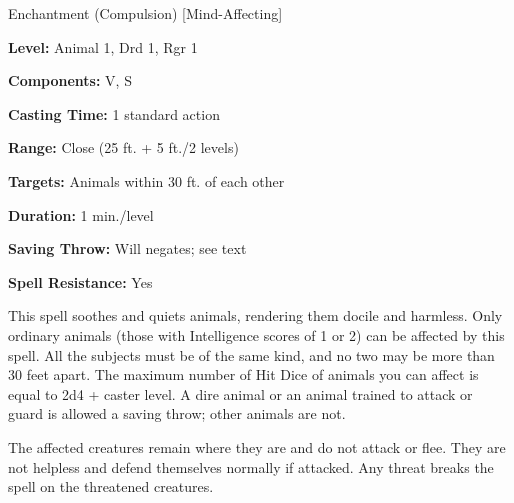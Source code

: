
Enchantment (Compulsion) [Mind-Affecting]

\textbf{Level:} Animal 1, Drd 1, Rgr 1

\textbf{Components:} V, S

\textbf{Casting Time:} 1 standard action

\textbf{Range:} Close (25 ft. + 5 ft./2 levels)

\textbf{Targets:} Animals within 30 ft. of each other

\textbf{Duration:} 1 min./level

\textbf{Saving Throw:} Will negates; see text

\textbf{Spell Resistance:} Yes

This spell soothes and quiets animals, rendering them docile and harmless. Only 
ordinary animals (those with Intelligence scores of 1 or 2) can be affected by 
this spell. All the subjects must be of the same kind, and no two may be more than 
30 feet apart. The maximum number of Hit Dice of animals you can affect is equal 
to 2d4 + caster level. A dire animal or an animal trained to attack or guard is 
allowed a saving throw; other animals are not.

The affected creatures remain where they are and do not attack or flee. They are 
not helpless and defend themselves normally if attacked. Any threat breaks the 
spell on the threatened creatures.

